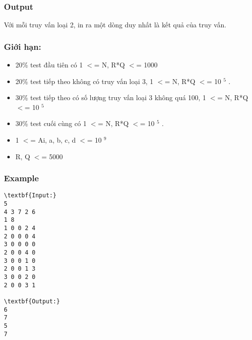 \subsubsection{Output}

Với mỗi truy vấn loại 2, in ra một dòng duy nhất là kết quả của truy vấn.

\subsubsection{Giới hạn:}
\begin{itemize}
	\item 20\% test đầu tiên có 1 $<$= N, R*Q $<$= 1000
	\item 20\% test tiếp theo không có truy vấn loại 3, 1 $<$= N, R*Q $<$= 10 $^ 5 $ .
	\item 30\% test tiếp theo có số lượng truy vấn loại 3 không quá 100, 1 $<$= N, R*Q $<$= 10 $^ 5 $
	\item 30\% test cuối cùng có 1 $<$= N, R*Q $<$= 10 $^ 5 $ .
	\item 1 $<$= Ai, a, b, c, d $<$= 10 $^ 9 $
	\item R, Q $<$= 5000
\end{itemize}

\subsubsection{Example}
\begin{verbatim}
\textbf{Input:}
5
4 3 7 2 6
1 8
1 0 0 2 4
2 0 0 0 4
3 0 0 0 0
2 0 0 4 0
3 0 0 1 0
2 0 0 1 3
3 0 0 2 0
2 0 0 3 1

\textbf{Output:}
6
7
5
7
\end{verbatim}
